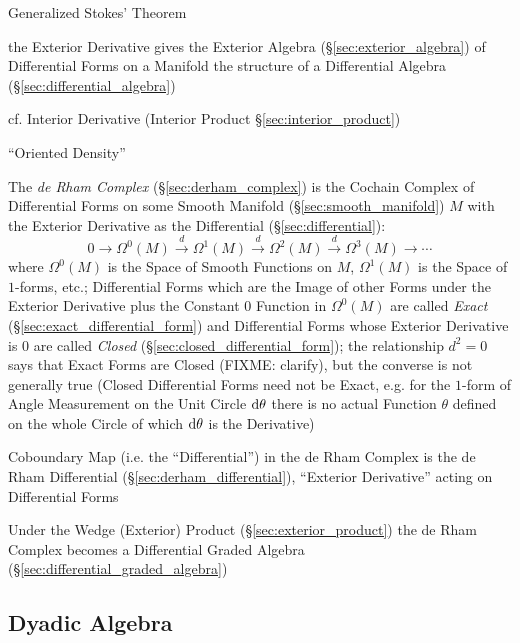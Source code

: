 {{Generalized Stokes' Theorem

the Exterior Derivative gives the Exterior Algebra
(\S\ref{sec:exterior_algebra}) of Differential Forms on a Manifold the structure
of a Differential Algebra (\S\ref{sec:differential_algebra})

\fist cf. Interior Derivative (Interior Product \S\ref{sec:interior_product})

``Oriented Density'' %

\asterism

The \emph{de Rham Complex} (\S\ref{sec:derham_complex}) is the Cochain Complex
of Differential Forms on some Smooth Manifold (\S\ref{sec:smooth_manifold}) $M$
with the Exterior Derivative as the Differential (\S\ref{sec:differential}):
\[
  0 \rightarrow \Omega^0(M) \xrightarrow{d} \Omega^1(M) \xrightarrow{d}
  \Omega^2(M) \xrightarrow{d} \Omega^3(M) \rightarrow \cdots
\]
where $\Omega^0(M)$ is the Space of Smooth Functions on $M$, $\Omega^1(M)$ is
the Space of $1$-forms, etc.; Differential Forms which are the Image of other
Forms under the Exterior Derivative plus the Constant $0$ Function in
$\Omega^0(M)$ are called \emph{Exact} (\S\ref{sec:exact_differential_form}) and
Differential Forms whose Exterior Derivative is $0$ are called \emph{Closed}
(\S\ref{sec:closed_differential_form}); the relationship $d^2 = 0$ says that
Exact Forms are Closed (FIXME: clarify), but the converse is not generally true
(Closed Differential Forms need not be Exact, e.g. for the $1$-form of Angle
Measurement on the Unit Circle $\mathrm{d}\theta$ there is no actual Function
$\theta$ defined on the whole Circle of which $\mathrm{d}\theta$ is the
Derivative)

Coboundary Map (i.e. the ``Differential'') in the de Rham Complex is the de Rham
Differential (\S\ref{sec:derham_differential}), ``Exterior Derivative'' acting
on Differential Forms

Under the Wedge (Exterior) Product (\S\ref{sec:exterior_product}) the de Rham
Complex becomes a Differential Graded Algebra
(\S\ref{sec:differential_graded_algebra})



\subsection{Dyadic Algebra}\label{sec:dyadic_algebra}

}}
